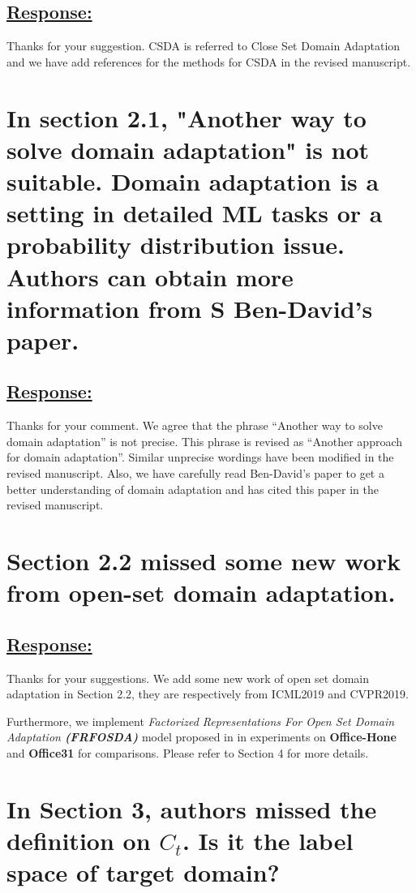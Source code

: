 \subsection*{\underline{\textbf{Response:}}}
Thanks for your suggestion.
CSDA is referred to Close Set Domain Adaptation and we have add references \cite{ben2010theory,Elsevier-DeepVisualDA,TransferLearningSurvey} for the methods for CSDA in the revised manuscript.

\section{In section 2.1, "Another way to solve domain adaptation" is not suitable. 
Domain adaptation is a setting in detailed ML tasks or a probability distribution issue. 
Authors can obtain more information from S Ben-David's paper.}
\subsection*{\underline{\textbf{Response:}}}
Thanks for your comment.
We agree that the phrase ``Another way to solve domain adaptation'' is not precise. 
This phrase is revised as ``Another approach for domain adaptation''. 
Similar unprecise wordings have been modified in the revised manuscript.
Also, we have carefully read Ben-David's paper \cite{ben2010theory} to get a better understanding of domain adaptation and has cited this paper in the revised manuscript.


\section{Section 2.2 missed some new work from open-set domain adaptation.}
\subsection*{\underline{\textbf{Response:}}}
Thanks for your suggestions.
We add some new work \cite{PDA-fac,PDA-sep} of open set domain adaptation in Section 2.2, they are respectively from ICML2019 and CVPR2019.

Furthermore, we implement \textit{Factorized Representations For Open Set Domain Adaptation \textbf{(FRFOSDA)}} model proposed in \cite{PDA-fac} in experiments on \textbf{Office-Hone} and \textbf{Office31} for comparisons.
Please refer to Section 4 for more details.

\section{In Section 3, authors missed the definition on $C_t$. Is it the label space of target domain?}

